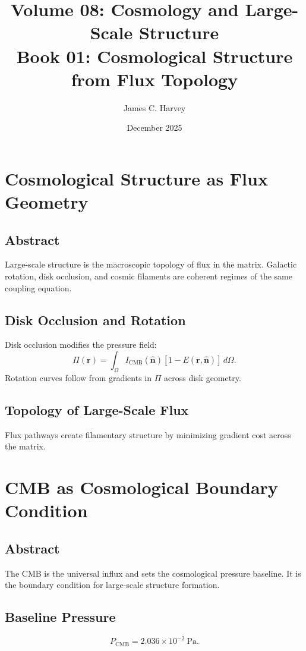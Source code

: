 \documentclass[12pt]{book}
\title{Volume 08: Cosmology and Large-Scale Structure \\ Book 01: Cosmological Structure from Flux Topology}
\author{James C. Harvey}
\date{December 2025}
\begin{document}
\maketitle
\tableofcontents

\chapter{Cosmological Structure as Flux Geometry}

\section*{Abstract}
Large-scale structure is the macroscopic topology of flux in the matrix. Galactic rotation, disk
occlusion, and cosmic filaments are coherent regimes of the same coupling equation.

\section{Disk Occlusion and Rotation}
Disk occlusion modifies the pressure field:
\begin{equation}
\Pi(\mathbf{r}) = \int_{\Omega} I_{\text{CMB}}(\hat{\mathbf{n}})\left[1 - E(\mathbf{r},\hat{\mathbf{n}})\right]\, d\Omega.
\end{equation}
Rotation curves follow from gradients in $\Pi$ across disk geometry.

\section{Topology of Large-Scale Flux}
Flux pathways create filamentary structure by minimizing gradient cost across the matrix.

\chapter{CMB as Cosmological Boundary Condition}

\section*{Abstract}
The CMB is the universal influx and sets the cosmological pressure baseline. It is the boundary condition
for large-scale structure formation.

\section{Baseline Pressure}
\begin{equation}
P_{\text{CMB}} = 2.036 \times 10^{-2}\ \text{Pa}.
\end{equation}
\end{document}
